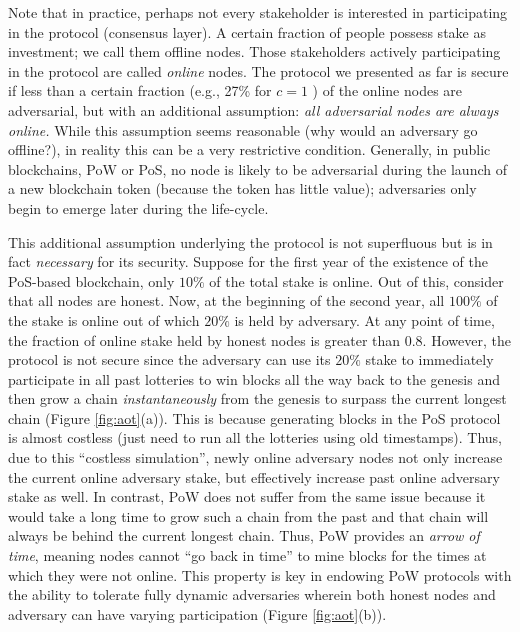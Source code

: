 \documentclass{article}
\begin{document}
Note that in practice, perhaps not every stakeholder is interested in participating in the protocol (consensus layer). A certain fraction of people possess stake as investment; we call them offline nodes. Those stakeholders actively participating in the protocol are called {\em online} nodes. The protocol we presented as far is secure if less than a certain fraction (e.g., 27\% for $c=1$ ) of the online nodes are adversarial, but with an additional assumption: {\em all adversarial nodes are always online.}  While this assumption seems reasonable (why would an adversary go offline?), in reality this can be a very restrictive condition. Generally, in public blockchains, PoW or PoS, no node is likely to be adversarial during the launch of a new blockchain token (because the token has little value);  adversaries only begin to emerge later during the life-cycle. 

This additional assumption underlying the protocol is not superfluous but is in fact {\em necessary} for its security. Suppose for the first year of the existence of the PoS-based blockchain, only $10\%$ of the total stake is online. Out of this, consider that all nodes are honest. Now, at the beginning of the second year, all $100\%$ of the stake is online out of which $20\%$ is held by adversary. At any point of time, the fraction of  online stake held by honest nodes is greater than $0.8$. However, the protocol is not secure since the adversary can use its $20\%$ stake to immediately participate in all past lotteries to win blocks all the way back to the genesis and then grow a chain {\em instantaneously} from the genesis to surpass the current longest chain (Figure \ref{fig:aot}(a)). This is because generating blocks in the PoS protocol is almost costless (just need to run all the lotteries using old timestamps). Thus, due to this ``costless simulation'', newly  online adversary nodes not only increase the current online adversary stake, but effectively increase past online adversary stake as well. In contrast, PoW does not suffer from the same issue because it would take a long time to grow such a chain from the past and that chain will always be behind the current longest chain. Thus, PoW provides an {\em arrow of time}, meaning nodes cannot ``go back in time'' to mine blocks for the times at which they were not online. This property is key in endowing PoW protocols with the ability to tolerate fully dynamic adversaries wherein both  honest  nodes  and  adversary  can have  varying  participation (Figure \ref{fig:aot}(b)). 
\end{document}
